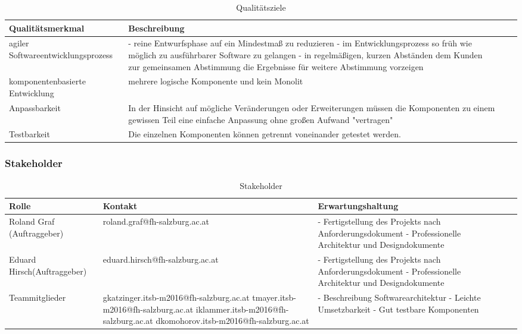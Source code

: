 \documentclass[12pt,a4paper,bibliography=totocnumbered,listof=totocnumbered]{scrartcl}
\begin{document}
\begin{table}[htbp]
  \centering
  \caption{Qualitätsziele}
    \begin{tabular}{| p{6cm} | p{10cm} |l|l|}
    \hline
    \textbf{Qualitätsmerkmal} & \textbf{Beschreibung} \bigstrut\\
    \hline
   agiler Softwareentwicklungsprozess & - reine Entwurfsphase auf ein Mindestmaß zu reduzieren \newline - im Entwicklungsprozess so früh wie möglich zu ausführbarer Software zu gelangen \newline - in regelmäßigen, kurzen Abständen dem Kunden zur gemeinsamen Abstimmung die Ergebnisse für weitere Abstimmung vorzeigen \bigstrut\\
    \hline
    komponentenbasierte Entwicklung & mehrere logische Komponente und kein Monolit \bigstrut\\
    \hline
    Anpassbarkeit & In der Hinsicht auf mögliche Veränderungen oder Erweiterungen müssen die Komponenten zu einem gewissen Teil eine einfache Anpassung ohne großen Aufwand "vertragen" \bigstrut\\
    \hline
    Testbarkeit & Die einzelnen Komponenten können getrennt voneinander getestet werden. \bigstrut\\
    \hline
    \end{tabular}%
  \label{tab:addlabel}%
\end{table}
\newpage
\subsubsection{Stakeholder}
\begin{table}[htbp]
  \centering
  \caption{Stakeholder}
    \begin{tabular}{| p{4cm} | p{6cm} | p{6cm} |l|l|l|}
    \hline
    \textbf{Rolle} & \textbf{Kontakt} & \textbf{Erwartungshaltung} \bigstrut\\
    \hline
     Roland Graf (Auftraggeber) &   roland.graf@fh-salzburg.ac.at &  - Fertigstellung des Projekts nach Anforderungsdokument \newline - Professionelle Architektur und Designdokumente \bigstrut\\
    \hline
     Eduard Hirsch(Auftraggeber)&  eduard.hirsch@fh-salzburg.ac.at & - Fertigstellung des Projekts nach Anforderungsdokument \newline - Professionelle Architektur und Designdokumente \bigstrut\\
    \hline
       Teammitglieder &  gkatzinger.itsb-m2016@fh-salzburg.ac.at \newline tmayer.itsb-m2016@fh-salzburg.ac.at \newline iklammer.itsb-m2016@fh-salzburg.ac.at \newline dkomohorov.itsb-m2016@fh-salzburg.ac.at &  - Beschreibung Softwarearchitektur \newline - Leichte Umsetzbarkeit \newline - Gut testbare Komponenten \bigstrut\\
    \hline
    \end{tabular}%
  \label{tab:addlabel}%
\end{table}
\end{document}
